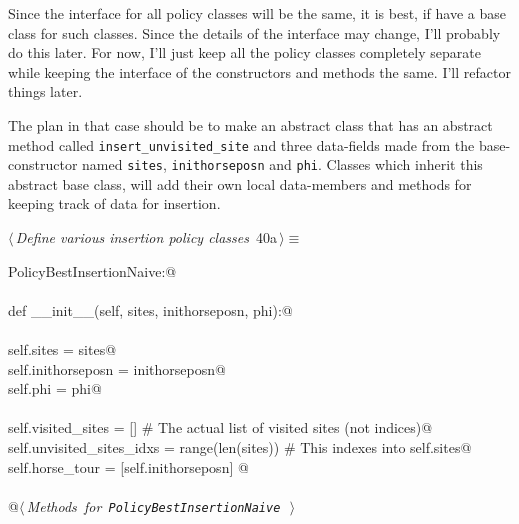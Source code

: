 \documentclass[11.5pt]{report}
\begin{document}
\newchunk Since the interface for all policy classes will be the same, it is 
best, if have a base class for such classes. Since the details of 
the interface may change, I'll probably do this later. For now, 
I'll just keep all the policy classes completely separate while 
keeping the interface of the constructors and methods the same. 
I'll refactor things later. 

The plan in that case should be to make an abstract class that 
has an abstract method called \texttt{insert\_unvisited\_site}
and three data-fields made from the base-constructor named \texttt{sites}, \texttt{inithorseposn}
and \texttt{phi}. Classes which inherit this abstract base class, will 
add their own local data-members and methods for keeping track of 
data for insertion. 

\begin{flushleft} \small\label{scrap54}\raggedright\small
{} $\langle\,${\itshape Define various insertion policy classes}\nobreak\ {\footnotesize {40a}}$\,\rangle\equiv$
\vspace{-1ex}
\begin{list}{}{} \item
\mbox{}\verb@class PolicyBestInsertionNaive:@\\
\mbox{}\verb@@\\
\mbox{}\verb@    def __init__(self, sites, inithorseposn, phi):@\\
\mbox{}\verb@@\\
\mbox{}\verb@         self.sites           = sites@\\
\mbox{}\verb@         self.inithorseposn   = inithorseposn@\\
\mbox{}\verb@         self.phi             = phi@\\
\mbox{}\verb@@\\
\mbox{}\verb@         self.visited_sites        = []                # The actual list of visited sites (not indices)@\\
\mbox{}\verb@         self.unvisited_sites_idxs = range(len(sites)) # This indexes into self.sites@\\
\mbox{}\verb@         self.horse_tour           = [self.inithorseposn]         @\\
\mbox{}\verb@@\\
\mbox{}\verb@    @\hbox{$\langle\,${\itshape Methods for \verb|PolicyBestInsertionNaive|}\nobreak\ {\footnotesize {}}$\,\rangle$}\verb@@\\
\mbox{}\verb@@{\NWsep}
\end{list}

\end{flushleft}
\end{document}
